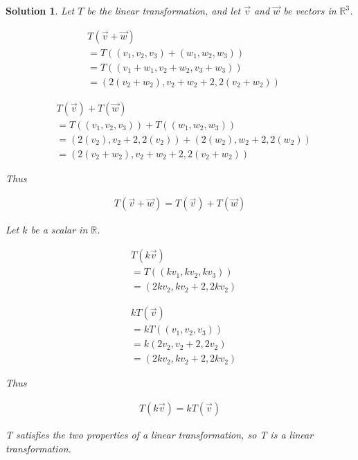 \documentclass{article}
\newtheorem*{solution}{Solution}
\begin{document}
\begin{solution}
Let $T$ be the linear transformation, and let $\vec{v}$ and $\vec{w}$ be vectors in $\mathbb{R}^3$.

\begin{align*}
& T(\vec{v} + \vec{w}) \\
&= T((v_{1}, v_{2}, v_{3}) + (w_{1}, w_{2}, w_{3})) \\
&= T((v_{1} + w_{1}, v_{2} + w_{2}, v_{3} + w_{3})) \\
&= (2(v_{2} + w_{2}), v_{2} + w_{2} + 2, 2(v_{2} + w_{2}))
\end{align*}

\begin{align*}
& T(\vec{v}) + T(\vec{w}) \\
&= T((v_{1}, v_{2}, v_{3})) + T((w_{1}, w_{2}, w_{3})) \\
&= (2(v_{2}), v_{2} + 2, 2(v_{2})) + (2(w_{2}), w_{2} + 2, 2(w_{2})) \\
&= (2(v_{2} + w_{2}), v_{2} + w_{2} + 2, 2(v_{2} + w_{2}))
\end{align*}

Thus 

\begin{align*}
T(\vec{v} + \vec{w}) = T(\vec{v}) + T(\vec{w})
\end{align*}

Let $k$ be a scalar in $\mathbb{R}$.

\begin{align*}
& T(k\vec{v}) \\
&= T((kv_{1}, kv_{2}, kv_{3})) \\
&= (2kv_{2}, kv_{2} + 2, 2kv_{2}) 
\end{align*}

\begin{align*}
& kT(\vec{v}) \\
&= kT((v_{1}, v_{2}, v_{3})) \\
&= k(2v_{2}, v_{2} + 2, 2v_{2}) \\
&= (2kv_{2}, kv_{2} + 2, 2kv_{2}) 
\end{align*}

Thus 

\begin{align*}
T(k\vec{v}) = kT(\vec{v})
\end{align*}

T satisfies the two properties of a linear transformation, so T is a linear transformation.

\end{solution}
\end{document}
